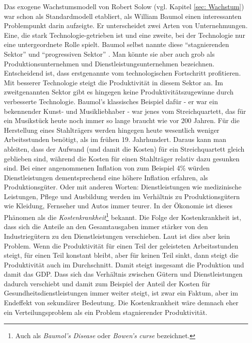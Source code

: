 Das exogene Wachstumsmodell von Robert Solow (vgl. Kapitel \ref{sec: Wachstum}) war schon als Standardmodell etabliert, als William Baumol einen interessanten Problempunkt darin aufzeigte. Er unterscheidet zwei Arten von Unternehmungen. Eine, die stark Technologie-getrieben ist und eine zweite, bei der Technologie nur eine untergeordnete Rolle spielt. Baumol selbst nannte diese "`stagnierenden Sektor"' und "`progressiven Sektor"' \parencite[S. XX]{Baumol2012}. Man könnte sie aber auch grob als Produktionsunternehmen und Dienstleistungsunternehmen bezeichnen. Entscheidend ist, dass erstgenannte vom technologischen Fortschritt profitieren. Mit besserer Technologie steigt die Produktivität in diesem Sektor an. Im zweitgenannten Sektor gibt es hingegen keine Produktivitätszugewinne durch verbesserte Technologie. Baumol's klassisches Beispiel dafür - er war ein bekennender Kunst- und Musikliebhaber \parencite[S. 228]{Krueger2001Interview} - war jenes vom Streichquartett, das für ein Musikstück heute noch immer so lange braucht wie vor 200 Jahren. Für die Herstellung eines Stahlträgers werden hingegen heute wesentlich weniger Arbeitsstunden benötigt, als im frühen 19. Jahrhundert. Daraus kann man ableiten, dass der Aufwand (und damit die Kosten) für ein Streichquartett gleich geblieben sind, während die Kosten für einen Stahlträger relativ dazu gesunken sind. Bei einer angenommenen Inflation von zum Beispiel 4\% würden Dienstleistungen dementsprechend eine höhere Inflation erfahren, als Produktionsgüter. Oder mit anderen Worten: Dienstleistungen wie medizinische Leistungen, Pflege und Ausbildung werden im Verhältnis zu Produktionsgütern wie Kleidung, Fernseher und Autos immer teurer. In der Ökonomie ist dieses Phänomen als die \textit{Kostenkrankheit}\footnote{Auch als \textit{Baumol's Disease} oder \textit{Bowen's curse} bezeichnet\parencite[S. 3]{Baumol2012}.} bekannt.
Die Folge der Kostenkrankheit ist, dass sich die Anteile an den Gesamtausgaben immer stärker von den Industriegütern zu den Dienstleistungen verschieben. Laut \textcite[S. 43]{Baumol2012} ist dies aber kein Problem. Wenn die Produktivität für einen Teil der geleisteten Arbeitsstunden steigt, für einen Teil konstant bleibt, aber für keinen Teil sinkt, dann steigt die Produktivität auch im Durchschnitt. Damit steigt insgesamt die Produktion und damit das GDP. Dass sich das Verhältnis zwischen Gütern und Dienstleistungen dadurch verschiebt und damit zum Beispiel der Anteil der Kosten für Gesundheitsdienstleistungen immer weiter steigt, ist zwar ein Faktum, aber im Endeffekt von sekundärer Bedeutung. Die Kostenkrankheit wäre demnach eher ein Verteilungsproblem als ein Problem stagnierender Produktivität. 

